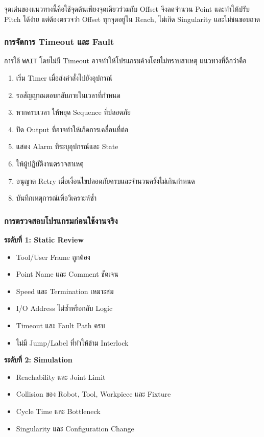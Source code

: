 จุดเด่นของแนวทางนี้คือใช้จุดต้นเพียงจุดเดียวร่วมกับ Offset จึงลดจำนวน Point และทำให้ปรับ Pitch ได้ง่าย แต่ต้องตรวจว่า Offset ทุกจุดอยู่ใน Reach, ไม่เกิด Singularity และไม่ชนขอบถาด

\subsubsection{การจัดการ Timeout และ Fault}

การใช้ \texttt{WAIT} โดยไม่มี Timeout อาจทำให้โปรแกรมค้างโดยไม่ทราบสาเหตุ แนวทางที่ดีกว่าคือ

\begin{enumerate}
    \item เริ่ม Timer เมื่อส่งคำสั่งไปยังอุปกรณ์
    \item รอสัญญาณตอบกลับภายในเวลาที่กำหนด
    \item หากครบเวลา ให้หยุด Sequence ที่ปลอดภัย
    \item ปิด Output ที่อาจทำให้เกิดการเคลื่อนที่ต่อ
    \item แสดง Alarm ที่ระบุอุปกรณ์และ State
    \item ให้ผู้ปฏิบัติงานตรวจสาเหตุ
    \item อนุญาต Retry เมื่อเงื่อนไขปลอดภัยครบและจำนวนครั้งไม่เกินกำหนด
    \item บันทึกเหตุการณ์เพื่อวิเคราะห์ซ้ำ
\end{enumerate}

\subsubsection{การตรวจสอบโปรแกรมก่อนใช้งานจริง}

\textbf{ระดับที่ 1: Static Review}

\begin{itemize}
    \item Tool/User Frame ถูกต้อง
    \item Point Name และ Comment ชัดเจน
    \item Speed และ Termination เหมาะสม
    \item I/O Address ไม่ซ้ำหรือกลับ Logic
    \item Timeout และ Fault Path ครบ
    \item ไม่มี Jump/Label ที่ทำให้ข้าม Interlock
\end{itemize}

\textbf{ระดับที่ 2: Simulation}

\begin{itemize}
    \item Reachability และ Joint Limit
    \item Collision ของ Robot, Tool, Workpiece และ Fixture
    \item Cycle Time และ Bottleneck
    \item Singularity และ Configuration Change
\end{itemize}

